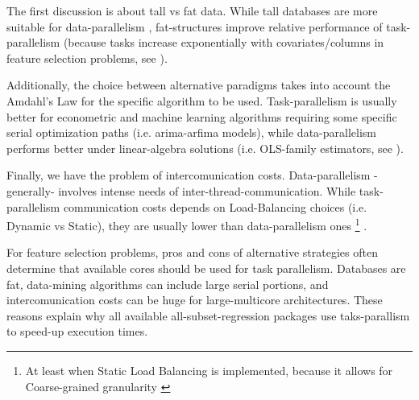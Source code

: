 \documentclass{juliacon}
\begin{document}
The first discussion is about tall vs fat data. While tall databases are more suitable for data-parallelism \cite{babu2013}, fat-structures improve relative performance of task-parallelism (because tasks increase exponentially with covariates/columns in feature selection problems, see \cite{foster1994}). \vskip 6pt

Additionally, the choice between alternative paradigms takes into account the Amdahl's Law for the specific algorithm to be used. Task-parallelism is usually better for econometric and machine learning algorithms requiring some specific serial optimization paths (i.e. arima-arfima models), while data-parallelism performs better under linear-algebra solutions (i.e. OLS-family estimators, see \cite{guo2012}). \vskip 6pt

Finally, we have the problem of intercomunication costs. Data-parallelism -generally- involves intense needs of inter-thread-communication. While task-parallelism communication costs depends on Load-Balancing choices (i.e. Dynamic vs Static), they are usually lower than data-parallelism ones \footnote{At least when Static Load Balancing is implemented, because it allows for Coarse-grained granularity \cite{gordon2006}} \cite{MOREANO2017}. \vskip 6pt

For feature selection problems, pros and cons of alternative strategies often determine that available cores should be used for task parallelism. Databases are fat, data-mining algorithms can include large serial portions, and intercomunication costs can be huge for large-multicore architectures. These reasons explain why all available all-subset-regression packages use taks-parallism to speed-up execution times. \vskip 6pt




\end{document}
